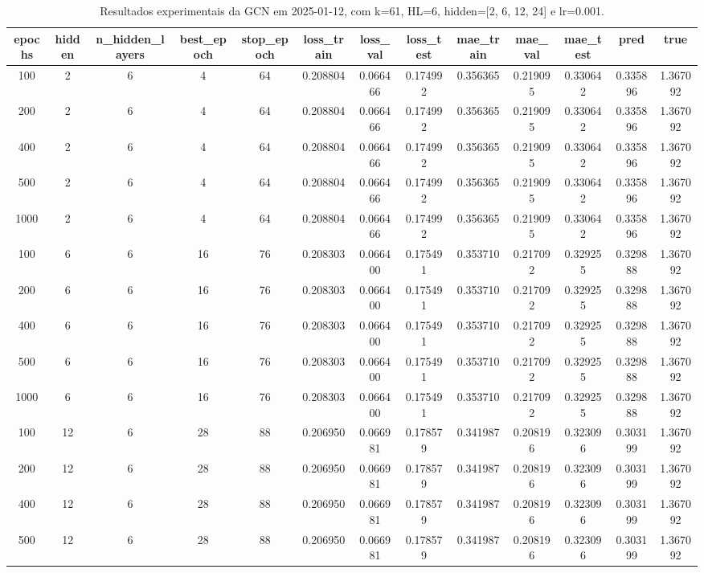 \begin{table}[h]
\centering
\caption{Resultados experimentais da GCN em 2025-01-12, com k=61, HL=6, hidden=[2, 6, 12, 24] e lr=0.001.}
\label{tab:gcn_results_k61_hl6_d20250112}
\begin{tabular}{ccccccccccccc}
\toprule
epochs & hidden & n\_hidden\_layers & best\_epoch & stop\_epoch & loss\_train & loss\_val & loss\_test & mae\_train & mae\_val & mae\_test & pred & true \\
\midrule
100 & 2 & 6 & 4 & 64 & 0.208804 & 0.066466 & 0.174992 & 0.356365 & 0.219095 & 0.330642 & 0.335896 & 1.367092 \\
200 & 2 & 6 & 4 & 64 & 0.208804 & 0.066466 & 0.174992 & 0.356365 & 0.219095 & 0.330642 & 0.335896 & 1.367092 \\
400 & 2 & 6 & 4 & 64 & 0.208804 & 0.066466 & 0.174992 & 0.356365 & 0.219095 & 0.330642 & 0.335896 & 1.367092 \\
500 & 2 & 6 & 4 & 64 & 0.208804 & 0.066466 & 0.174992 & 0.356365 & 0.219095 & 0.330642 & 0.335896 & 1.367092 \\
1000 & 2 & 6 & 4 & 64 & 0.208804 & 0.066466 & 0.174992 & 0.356365 & 0.219095 & 0.330642 & 0.335896 & 1.367092 \\
100 & 6 & 6 & 16 & 76 & 0.208303 & 0.066400 & 0.175491 & 0.353710 & 0.217092 & 0.329255 & 0.329888 & 1.367092 \\
200 & 6 & 6 & 16 & 76 & 0.208303 & 0.066400 & 0.175491 & 0.353710 & 0.217092 & 0.329255 & 0.329888 & 1.367092 \\
400 & 6 & 6 & 16 & 76 & 0.208303 & 0.066400 & 0.175491 & 0.353710 & 0.217092 & 0.329255 & 0.329888 & 1.367092 \\
500 & 6 & 6 & 16 & 76 & 0.208303 & 0.066400 & 0.175491 & 0.353710 & 0.217092 & 0.329255 & 0.329888 & 1.367092 \\
1000 & 6 & 6 & 16 & 76 & 0.208303 & 0.066400 & 0.175491 & 0.353710 & 0.217092 & 0.329255 & 0.329888 & 1.367092 \\
100 & 12 & 6 & 28 & 88 & 0.206950 & 0.066981 & 0.178579 & 0.341987 & 0.208196 & 0.323096 & 0.303199 & 1.367092 \\
200 & 12 & 6 & 28 & 88 & 0.206950 & 0.066981 & 0.178579 & 0.341987 & 0.208196 & 0.323096 & 0.303199 & 1.367092 \\
400 & 12 & 6 & 28 & 88 & 0.206950 & 0.066981 & 0.178579 & 0.341987 & 0.208196 & 0.323096 & 0.303199 & 1.367092 \\
500 & 12 & 6 & 28 & 88 & 0.206950 & 0.066981 & 0.178579 & 0.341987 & 0.208196 & 0.323096 & 0.303199 & 1.367092 \\

\end{tabular}
\end{table}

